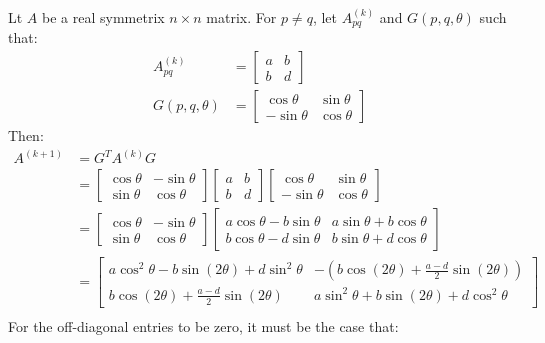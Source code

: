 \documentclass{article}
\begin{document}
\clearpage
\problem{}
Lt $A$ be a real symmetrix $n \times n$ matrix. For $p \neq q$, let $A^{(k)}_{pq}$ and $G(p, q, \theta)$ such that:
\begin{align*}
    A^{(k)}_{pq} & = \begin{bmatrix}
        a & b \\ b & d
    \end{bmatrix} \\
    G(p, q, \theta) & = \begin{bmatrix}
        \cos\theta & \sin\theta \\ -\sin\theta & \cos\theta
    \end{bmatrix}
\end{align*}
Then:
\begin{align*}
    A^{(k+1)} & = G^TA^{(k)}G \\
    & = \begin{bmatrix}
        \cos\theta & -\sin\theta \\ \sin\theta & \cos\theta
    \end{bmatrix}\begin{bmatrix}
        a & b \\ b & d
    \end{bmatrix}\begin{bmatrix}
        \cos\theta & \sin\theta \\ -\sin\theta & \cos\theta
    \end{bmatrix} \\
    & = \begin{bmatrix}
        \cos\theta & -\sin\theta \\ \sin\theta & \cos\theta
    \end{bmatrix}\begin{bmatrix}
        a\cos\theta - b\sin\theta & a\sin\theta + b\cos\theta \\ b\cos\theta - d\sin\theta & b\sin\theta + d\cos\theta
    \end{bmatrix} \\
    & = \begin{bmatrix}
        a\cos^2\theta - b\sin(2\theta) + d\sin^2\theta & -\left(b\cos(2\theta) + \frac{a-d}{2}\sin(2\theta)\right) \\ b\cos(2\theta) + \frac{a-d}{2}\sin(2\theta) & a\sin^2\theta + b\sin(2\theta) + d\cos^2\theta
    \end{bmatrix} \\
\end{align*}
For the off-diagonal entries to be zero, it must be the case that:
\end{document}
